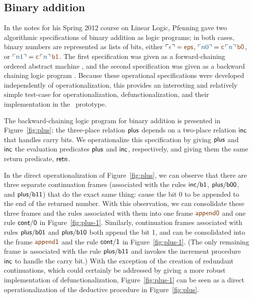 \subsection{Binary addition}

In the notes for his Spring 2012 course on Linear Logic,
Pfenning gave two algorithmic specifications of binary addition as logic
programs; in both cases, binary numbers are represented as lists of
bits, either $\interp{\epsilon} = \lf{\sf eps}$, $\interp{n0} =
\lf{\sf c}\,\interp{n}\,\lf{\sf b0}$, or $\interp{n1} =
\lf{\sf c}\,\interp{n}\,\lf{\sf b1}$.  The first specification was given as a
forward-chaining ordered abstract machine \cite{pfenning12ordered},
and the second specification was given as a backward chaining logic
program \cite{pfenning12backward}.  Because these operational
specifications were developed independently of operationalization,
this provides an interesting and relatively simple test-case for
operationalization, defunctionalization, and their implementation in
the \sls~prototype.

The backward-chaining logic program for binary addition is presented
in Figure~\ref{fig:plus}; the three-place relation ${\sf plus}$
depends on a two-place relation ${\sf inc}$ that handles carry bits.
We operationalize this specification by giving ${\sf plus}$ and ${\sf
  inc}$ the evaluation predicates ${\sf plus}$ and ${\sf inc}$,
respectively, and giving them the same return predicate, ${\sf retn}$.

In the direct operationalization of Figure~\ref{fig:plus}, we can
observe that there are three separate continuation frames (associated
with the rules ${\sf inc/b1}$, ${\sf plus/b00}$, and ${\sf plus/b11}$)
that do the exact same thing: cause the bit 0 to be appended to the end
of the returned number. With this observation, we can consolidate
these three frames and the rules associated with them into one frame
$\lf{\sf append0}$ and one rule ${\sf cont/0}$ in
Figure~\ref{fig:plus-1}. Similarly, continuation frames associated
with rules ${\sf plus/b01}$ and ${\sf plus/b10}$ both append the bit
1, and can be consolidated into the frame $\lf{\sf append1}$ and the rule
${\sf cont/1}$ in Figure~\ref{fig:plus-1}. (The only remaining frame
is associated with the rule ${\sf plus/b11}$ and invokes the increment
procedure ${\sf inc}$ to handle the carry bit.) With the exception of
the creation of redundant continuations, which could certainly be
addressed by giving a more robust implementation of
defunctionalization, Figure~\ref{fig:plus-1} can be seen as a direct
operationalization of the deductive procedure in
Figure~\ref{fig:plus}.

